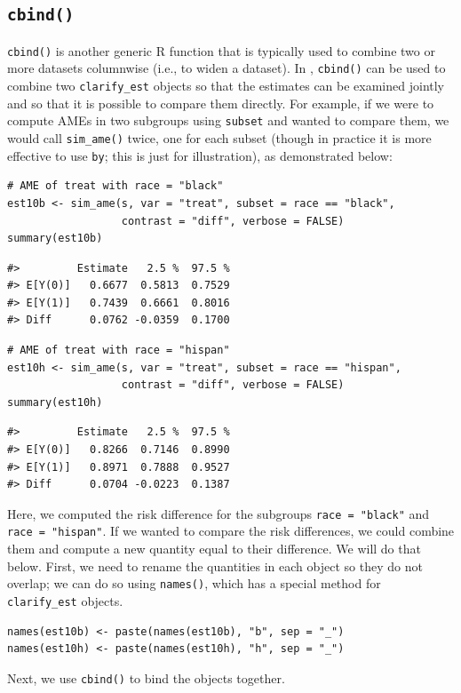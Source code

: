 \subsection{\texorpdfstring{\texttt{cbind()}}{cbind()}}\label{cbind}
\texttt{cbind()} is another generic R function that is typically used to combine two or more datasets columnwise (i.e., to widen a dataset). In , \texttt{cbind()} can be used to combine two \texttt{clarify\_est} objects so that the estimates can be examined jointly and so that it is possible to compare them directly. For example, if we were to compute AMEs in two subgroups using \texttt{subset} and wanted to compare them, we would call \texttt{sim\_ame()} twice, one for each subset (though in practice it is more effective to use \texttt{by}; this is just for illustration), as demonstrated below:
\begin{verbatim}
# AME of treat with race = "black"
est10b <- sim_ame(s, var = "treat", subset = race == "black",
                  contrast = "diff", verbose = FALSE)
summary(est10b)
\end{verbatim}
\begin{verbatim}
#>         Estimate   2.5 %  97.5 %
#> E[Y(0)]   0.6677  0.5813  0.7529
#> E[Y(1)]   0.7439  0.6661  0.8016
#> Diff      0.0762 -0.0359  0.1700
\end{verbatim}
\begin{verbatim}
# AME of treat with race = "hispan"
est10h <- sim_ame(s, var = "treat", subset = race == "hispan",
                  contrast = "diff", verbose = FALSE)
summary(est10h)
\end{verbatim}
\begin{verbatim}
#>         Estimate   2.5 %  97.5 %
#> E[Y(0)]   0.8266  0.7146  0.8990
#> E[Y(1)]   0.8971  0.7888  0.9527
#> Diff      0.0704 -0.0223  0.1387
\end{verbatim}
Here, we computed the risk difference for the subgroups \texttt{race\ =\ "black"} and \texttt{race\ =\ "hispan"}. If we wanted to compare the risk differences, we could combine them and compute a new quantity equal to their difference. We will do that below.
First, we need to rename the quantities in each object so they do not overlap; we can do so using \texttt{names()}, which has a special method for \texttt{clarify\_est} objects.
\begin{verbatim}
names(est10b) <- paste(names(est10b), "b", sep = "_")
names(est10h) <- paste(names(est10h), "h", sep = "_")
\end{verbatim}
Next, we use \texttt{cbind()} to bind the objects together.

